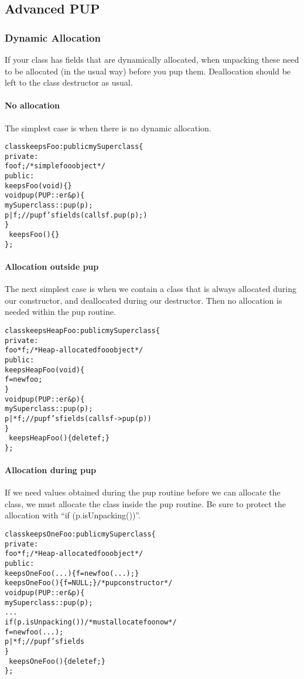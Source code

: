\subsection{Advanced PUP}

\subsubsection{Dynamic Allocation}

\label{sec:pupdynalloc}

If your class has fields that are dynamically allocated, when unpacking
these need to be allocated (in the usual way) before you pup them.
Deallocation should be left to the class destructor as usual.

\paragraph{No allocation}

The simplest case is when there is no dynamic allocation.
\begin{alltt}
class keepsFoo : public mySuperclass \{
private:
    foo f; /* simple foo object*/
public:
    keepsFoo(void) \{ \}
    void pup(PUP::er &p) \{
      mySuperclass::pup(p);
      p|f; // pup f's fields (calls f.pup(p);) 
    \}
    ~keepsFoo() \{ \}
\};
\end{alltt}

\paragraph{Allocation outside pup}

The next simplest case is when we contain a class 
that is always allocated during our constructor,
and deallocated during our destructor.  Then no allocation
is needed within the pup routine.
\begin{alltt}
class keepsHeapFoo : public mySuperclass \{
private:
    foo *f; /*Heap-allocated foo object*/
public:
    keepsHeapFoo(void) \{
      f=new foo;
    \}
    void pup(PUP::er &p) \{
      mySuperclass::pup(p);
      p|*f; // pup f's fields (calls f->pup(p))
    \}
    ~keepsHeapFoo() \{delete f;\}
\};
\end{alltt}

\paragraph{Allocation during pup}

If we need values obtained during the pup routine
before we can allocate the class, we must 
allocate the class inside the pup routine.
Be sure to protect the allocation with ``if (p.isUnpacking())''.
\begin{alltt}
class keepsOneFoo : public mySuperclass \{
private:
    foo *f; /*Heap-allocated foo object*/
public:
    keepsOneFoo(...) \{f=new foo(...);\}
    keepsOneFoo() \{f=NULL;\} /* pup constructor */
    void pup(PUP::er &p) \{
      mySuperclass::pup(p);
      ...
      if (p.isUnpacking()) /* must allocate foo now */
         f=new foo(...);
      p|*f;//pup f's fields
    \}
    ~keepsOneFoo() \{delete f;\}
\};
\end{alltt}

